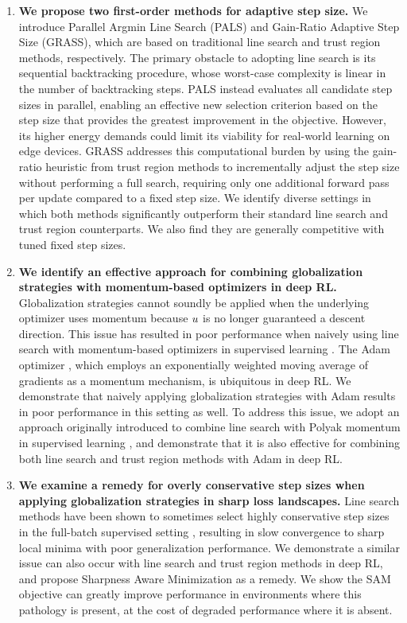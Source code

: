 \begin{enumerate}
\item \textbf{We propose two first-order methods for adaptive step size.} We introduce Parallel Argmin Line Search (PALS) and Gain-Ratio Adaptive Step Size (GRASS), which are based on traditional line search and trust region methods, respectively. The primary obstacle to adopting line search is its sequential backtracking procedure, whose worst-case complexity is linear in the number of backtracking steps. PALS instead evaluates all candidate step sizes in parallel, enabling an effective new selection criterion based on the step size that provides the greatest improvement in the objective. However, its higher energy demands could limit its viability for real-world learning on edge devices. GRASS addresses this computational burden by using the gain-ratio heuristic from trust region methods to incrementally adjust the step size without performing a full search, requiring only one additional forward pass per update compared to a fixed step size. We identify diverse settings in which both methods significantly outperform their standard line search and trust region counterparts. We also find they are generally competitive with tuned fixed step sizes.
\item \textbf{We identify an effective approach for combining globalization strategies with momentum-based optimizers in deep RL.} Globalization strategies cannot soundly be applied when the underlying optimizer uses momentum because $u$ is no longer guaranteed a descent direction. This issue has resulted in poor performance when naively using line search with momentum-based optimizers in supervised learning . The Adam optimizer \cite{kingma2015adam}, which employs an exponentially weighted moving average of gradients as a momentum mechanism, is ubiquitous in deep RL. We demonstrate that naively applying globalization strategies with Adam results in poor performance in this setting as well.  To address this issue, we adopt an approach originally introduced to combine line search with Polyak momentum in supervised learning \cite{vaswani2020adaptive}, and demonstrate that it is also effective for combining both line search and trust region methods with Adam in deep RL. 
\item \textbf{We examine a remedy for overly conservative step sizes when applying globalization strategies in sharp loss landscapes.} Line search methods have been shown to sometimes select highly conservative step sizes in the full-batch supervised setting \cite{roulet2024stepping}, resulting in slow convergence to sharp local minima with poor generalization performance. We demonstrate a similar issue can also occur with line search and trust region methods in deep RL, and propose Sharpness Aware Minimization  as a remedy. We show the SAM objective can greatly improve performance in environments where this pathology is present, at the cost of degraded performance where it is absent.
\end{enumerate}


